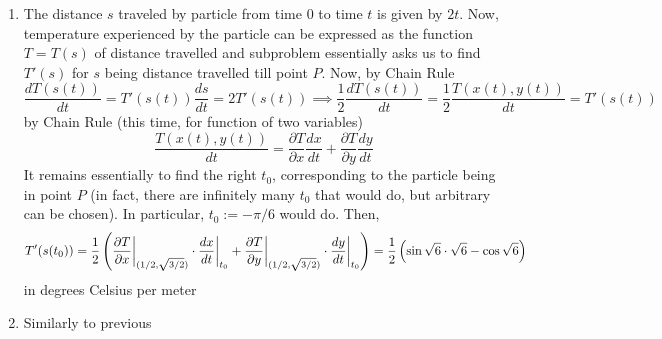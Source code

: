 \documentclass[8pt]{article} %
\begin{document}
\begin{description}
{\begin{enumerate}[\bfseries(a)]
			\item The distance $s$ traveled by particle from time $0$ to time $t$ is given by $2t$. Now, temperature experienced by
				the particle can be expressed as the function $T=T(s)$ of distance travelled and subproblem
				essentially asks us to find $T'(s)$ for $s$ being distance travelled till point $P$. Now, by Chain Rule
				\[\frac{dT(s(t))}{dt}=T'(s(t))\frac{ds}{dt}=2T'(s(t))\implies \frac{1}{2}\frac{dT(s(t))}{dt}=\frac{1}{2}
				\frac{T(x(t),y(t))}{dt}=T'(s(t))\]
				by Chain Rule (this time, for function of two variables)
				\[\frac{T(x(t),y(t))}{dt}=\frac{\partial T}{\partial x}\frac{dx}{dt}+\frac{\partial T}{\partial y}\frac{dy}{dt}\]
				It remains essentially to find the right $t_0$, corresponding to the particle being in point $P$ (in fact, there
				are infinitely many $t_0$ that would do, but arbitrary can be chosen). In particular, $t_0:=-\pi/6$ would do.
				Then, \[T'(s(t_0))=\frac{1}{2}\left(
				\frac{\partial T}{\partial x}\bigg|_{(1/2,\sqrt{3/2})}\cdot\frac{dx}{dt}\bigg|_{t_0}+
				\frac{\partial T}{\partial y}\bigg|_{(1/2,\sqrt{3/2})}\cdot\frac{dy}{dt}\bigg|_{t_0}\right)=
				\frac{1}{2}\left(\sin\sqrt{6}\cdot\sqrt{6}-\cos\sqrt{6}\right)\]in degrees Celsius per meter
			\item Similarly to previous 
		\end{enumerate}
		}
\end{description}
\end{document}
